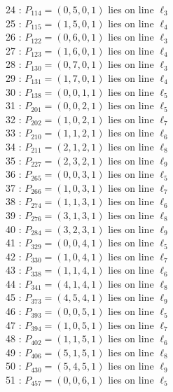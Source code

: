 \documentclass{article}
\begin{document}
{\begin{multicols}{2}
24 : $P_{114}=( 0, 5, 0, 1 )$ lies on line $\ell_{3}$\\
25 : $P_{115}=( 1, 5, 0, 1 )$ lies on line $\ell_{4}$\\
26 : $P_{122}=( 0, 6, 0, 1 )$ lies on line $\ell_{3}$\\
27 : $P_{123}=( 1, 6, 0, 1 )$ lies on line $\ell_{4}$\\
28 : $P_{130}=( 0, 7, 0, 1 )$ lies on line $\ell_{3}$\\
29 : $P_{131}=( 1, 7, 0, 1 )$ lies on line $\ell_{4}$\\
30 : $P_{138}=( 0, 0, 1, 1 )$ lies on line $\ell_{5}$\\
31 : $P_{201}=( 0, 0, 2, 1 )$ lies on line $\ell_{5}$\\
32 : $P_{202}=( 1, 0, 2, 1 )$ lies on line $\ell_{7}$\\
33 : $P_{210}=( 1, 1, 2, 1 )$ lies on line $\ell_{6}$\\
34 : $P_{211}=( 2, 1, 2, 1 )$ lies on line $\ell_{8}$\\
35 : $P_{227}=( 2, 3, 2, 1 )$ lies on line $\ell_{9}$\\
36 : $P_{265}=( 0, 0, 3, 1 )$ lies on line $\ell_{5}$\\
37 : $P_{266}=( 1, 0, 3, 1 )$ lies on line $\ell_{7}$\\
38 : $P_{274}=( 1, 1, 3, 1 )$ lies on line $\ell_{6}$\\
39 : $P_{276}=( 3, 1, 3, 1 )$ lies on line $\ell_{8}$\\
40 : $P_{284}=( 3, 2, 3, 1 )$ lies on line $\ell_{9}$\\
41 : $P_{329}=( 0, 0, 4, 1 )$ lies on line $\ell_{5}$\\
42 : $P_{330}=( 1, 0, 4, 1 )$ lies on line $\ell_{7}$\\
43 : $P_{338}=( 1, 1, 4, 1 )$ lies on line $\ell_{6}$\\
44 : $P_{341}=( 4, 1, 4, 1 )$ lies on line $\ell_{8}$\\
45 : $P_{373}=( 4, 5, 4, 1 )$ lies on line $\ell_{9}$\\
46 : $P_{393}=( 0, 0, 5, 1 )$ lies on line $\ell_{5}$\\
47 : $P_{394}=( 1, 0, 5, 1 )$ lies on line $\ell_{7}$\\
48 : $P_{402}=( 1, 1, 5, 1 )$ lies on line $\ell_{6}$\\
49 : $P_{406}=( 5, 1, 5, 1 )$ lies on line $\ell_{8}$\\
50 : $P_{430}=( 5, 4, 5, 1 )$ lies on line $\ell_{9}$\\
51 : $P_{457}=( 0, 0, 6, 1 )$ lies on line $\ell_{5}$\\

\end{multicols}}
\end{document}

